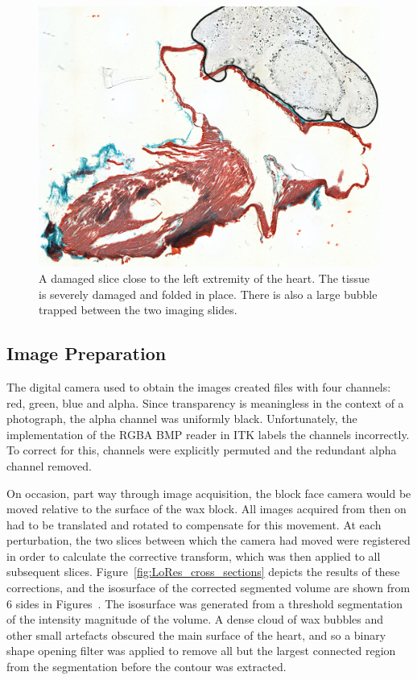     \begin{figure}[htbp]
      \centering
      \includegraphics[width=.8\textwidth]{Ch6/Figs/damaged_slice}
      \caption{A damaged slice close to the left extremity of the heart. The tissue is severely damaged and folded in place. There is also a large bubble trapped between the two imaging slides.}
      \label{fig:damaged_slice}
    \end{figure}
    
  
  \subsection{Image Preparation} %
  \label{sub:image_preparation}
  	The digital camera used to obtain the images created files with four channels: red, green, blue and alpha. Since transparency is meaningless in the context of a photograph, the alpha channel was uniformly black. Unfortunately, the implementation of the RGBA BMP reader in ITK labels the channels incorrectly. To correct for this, channels were explicitly permuted and the redundant alpha channel removed.
  
    On occasion, part way through image acquisition, the block face camera would be moved relative to the surface of the wax block. All images acquired from then on had to be translated and rotated to compensate for this movement. At each perturbation, the two slices between which the camera had moved were registered in order to calculate the corrective transform, which was then applied to all subsequent slices. Figure~\ref{fig:LoRes_cross_sections} depicts the results of these corrections, and the isosurface of the corrected segmented volume are shown from 6 sides in Figures~. The isosurface was generated from a threshold segmentation of the intensity magnitude of the volume. A dense cloud of wax bubbles and other small artefacts obscured the main surface of the heart, and so a binary shape opening filter was applied to remove all but the largest connected region from the segmentation before the contour was extracted.
    
